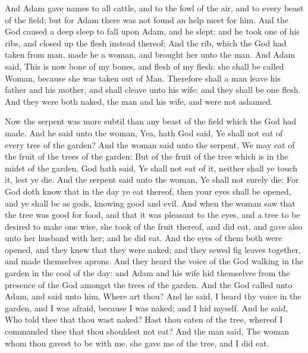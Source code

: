 \begin{biblechapter}
\verse And Adam gave names to all cattle, and to the fowl of the air, and to every beast of the field; but for Adam there was not found an help meet for him.
\verse And the \LORD God caused a deep sleep to fall upon Adam, and he slept: and he took one of his ribs, and closed up the flesh instead thereof;
\verse And the rib, which the \LORD God had taken from man, made he a woman, and brought her unto the man.
\verse And Adam said, This is now bone of my bones, and flesh of my flesh: she shall be called Woman, because she was taken out of Man.
\verse Therefore shall a man leave his father and his mother, and shall cleave unto his wife: and they shall be one flesh.
\verse And they were both naked, the man and his wife, and were not ashamed.
\end{biblechapter}

\begin{biblechapter} %
 Now the serpent was more subtil than any beast of the field which the \LORD God had made. And he said unto the woman, Yea, hath God said, Ye shall not eat of every tree of the garden?
\verse And the woman said unto the serpent, We may eat of the fruit of the trees of the garden:
\verse But of the fruit of the tree which is in the midst of the garden, God hath said, Ye shall not eat of it, neither shall ye touch it, lest ye die.
\verse And the serpent said unto the woman, Ye shall not surely die:
\verse For God doth know that in the day ye eat thereof, then your eyes shall be opened, and ye shall be as gods, knowing good and evil.
\verse And when the woman saw that the tree was good for food, and that it was pleasant to the eyes, and a tree to be desired to make one wise, she took of the fruit thereof, and did eat, and gave also unto her husband with her; and he did eat.
\verse And the eyes of them both were opened, and they knew that they were naked; and they sewed fig leaves together, and made themselves aprons.
\verse And they heard the voice of the \LORD God walking in the garden in the cool of the day: and Adam and his wife hid themselves from the presence of the \LORD God amongst the trees of the garden.
\verse And the \LORD God called unto Adam, and said unto him, Where art thou?
\verse And he said, I heard thy voice in the garden, and I was afraid, because I was naked; and I hid myself.
\verse And he said, Who told thee that thou wast naked? Hast thou eaten of the tree, whereof I commanded thee that thou shouldest not eat?
\verse And the man said, The woman whom thou gavest to be with me, she gave me of the tree, and I did eat.

\end{biblechapter}
